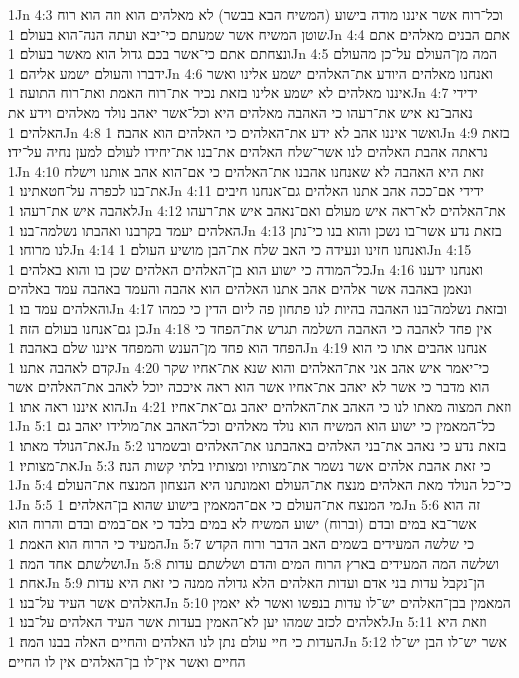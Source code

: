 1Jn 4:3  וכל־רוח אשר איננו מודה בישוע (המשיח הבא בבשר) לא מאלהים הוא וזה הוא רוח שוטן המשיח אשר שמעתם כי־יבא ועתה הנה־הוא בעולם׃
1Jn 4:4  אתם הבנים מאלהים אתם ונצחתם אתם כי־אשר בכם גדול הוא מאשר בעולם׃
1Jn 4:5  המה מן־העולם על־כן מהעולם ידברו והעולם ישמע אליהם׃
1Jn 4:6  ואנחנו מאלהים היודע את־האלהים ישמע אלינו ואשר איננו מאלהים לא ישמע אלינו בזאת נכיר את־רוח האמת ואת־רוח התועה׃
1Jn 4:7  ידידי נאהב־נא איש את־רעהו כי האהבה מאלהים היא וכל־אשר יאהב נולד מאלהים וידע את האלהים׃
1Jn 4:8  ואשר איננו אהב לא ידע את־האלהים כי האלהים הוא אהבה׃
1Jn 4:9  בזאת נראתה אהבת האלהים לנו אשר־שלח האלהים את־בנו את־יחידו לעולם למען נחיה על־ידו׃
1Jn 4:10  זאת היא האהבה לא שאנחנו אהבנו את־האלהים כי אם־הוא אהב אותנו וישלח את־בנו לכפרה על־חטאתינו׃
1Jn 4:11  ידידי אם־ככה אהב אתנו האלהים גם־אנחנו חיבים לאהבה איש את־רעהו׃
1Jn 4:12  את־האלהים לא־ראה איש מעולם ואם־נאהב איש את־רעהו האלהים יעמד בקרבנו ואהבתו נשלמה־בנו׃
1Jn 4:13  בזאת נדע אשר־בו נשכן והוא בנו כי־נתן לנו מרוחו׃
1Jn 4:14  ואנחנו חזינו ונעידה כי האב שלח את־הבן מושיע העולם׃
1Jn 4:15  כל־המודה כי ישוע הוא בן־האלהים האלהים שכן בו והוא באלהים׃
1Jn 4:16  ואנחנו ידענו ונאמן באהבה אשר אלהים אהב אתנו האלהים הוא אהבה והעמד באהבה עמד באלהים והאלהים עמד בו׃
1Jn 4:17  ובזאת נשלמה־בנו האהבה בהיות לנו פתחון פה ליום הדין כי כמהו כן גם־אנחנו בעולם הזה׃
1Jn 4:18  אין פחד לאהבה כי האהבה השלמה תגרש את־הפחד כי הפחד הוא פחד מן־הענש והמפחד איננו שלם באהבה׃
1Jn 4:19  אנחנו אהבים אתו כי הוא קדם לאהבה אתנו׃
1Jn 4:20  כי־יאמר איש אהב אני את־האלהים והוא שנא את־אחיו שקר הוא מדבר כי אשר לא יאהב את־אחיו אשר הוא ראה איככה יוכל לאהב את־האלהים אשר הוא איננו ראה אתו׃
1Jn 4:21  וזאת המצוה מאתו לנו כי האהב את־האלהים יאהב גם־את־אחיו׃
1Jn 5:1  כל־המאמין כי ישוע הוא המשיח הוא נולד מאלהים וכל־האהב את־מולידו יאהב גם את־הנולד מאתו׃
1Jn 5:2  בזאת נדע כי נאהב את־בני האלהים באהבתנו את־האלהים ובשמרנו את־מצותיו׃
1Jn 5:3  כי זאת אהבת אלהים אשר נשמר את־מצותיו ומצותיו בלתי קשות הנה׃
1Jn 5:4  כי־כל הנולד מאת האלהים מנצח את־העולם ואמונתנו היא הנצחון המנצח את־העולם׃
1Jn 5:5  מי המנצח את־העולם כי אם־המאמין בישוע שהוא בן־האלהים׃
1Jn 5:6  זה הוא אשר־בא במים ובדם (וברוח) ישוע המשיח לא במים בלבד כי אם־במים ובדם והרוח הוא המעיד כי הרוח הוא האמת׃
1Jn 5:7  כי שלשה המעידים בשמים האב הדבר ורוח הקדש ושלשתם אחד המה׃
1Jn 5:8  ושלשה המה המעידים בארץ הרוח המים והדם ושלשתם עדות אחת׃
1Jn 5:9  הן־נקבל עדות בני אדם ועדות האלהים הלא גדולה ממנה כי זאת היא עדות האלהים אשר העיד על־בנו׃
1Jn 5:10  המאמין בבן־האלהים יש־לו עדות בנפשו ואשר לא יאמין לאלהים לכזב שמהו יען לא־האמין בעדות אשר העיד האלהים על־בנו׃
1Jn 5:11  וזאת היא העדות כי חיי עולם נתן לנו האלהים והחיים האלה בבנו המה׃
1Jn 5:12  אשר יש־לו הבן יש־לו החיים ואשר אין־לו בן־האלהים אין לו החיים׃
